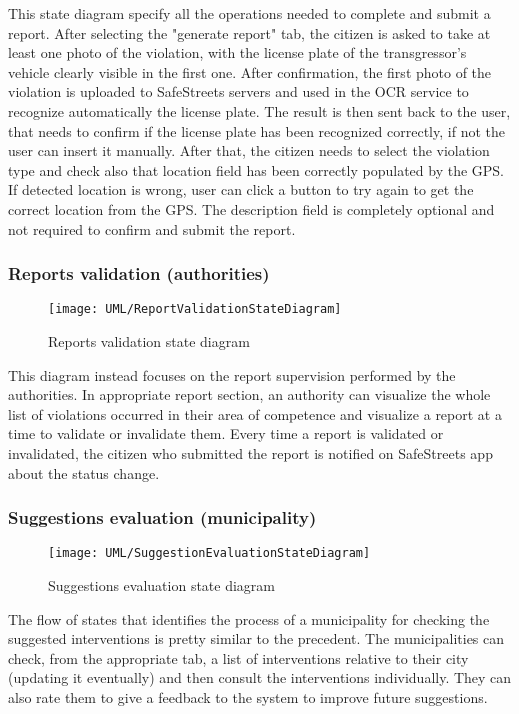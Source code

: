This state diagram specify all the operations needed to complete and submit a report. After selecting the "generate report" tab, the citizen is asked to take at least one photo of the violation, with the license plate of the transgressor's vehicle clearly visible in the first one. After confirmation, the first photo of the violation is uploaded to SafeStreets servers and used in the OCR service to recognize automatically the license plate. The result is then sent back to the user, that needs to confirm if the license plate has been recognized correctly, if not the user can insert it manually. After that, the citizen needs to select the violation type and check also that location field has been correctly populated by the GPS. If detected location is wrong, user can click a button to try again to get the correct location from the GPS. The description field is completely optional and not required to confirm and submit the report.

\subsubsection{Reports validation (authorities)}

\begin{figure}[H]
	\centering
	\texttt{[image: UML/ReportValidationStateDiagram]}
	\caption{Reports validation state diagram}
\end{figure}

This diagram instead focuses on the report supervision performed by the authorities. In appropriate report section, an authority can visualize the whole list of violations occurred in their area of competence and visualize a report at a time to validate or invalidate them. Every time a report is validated or invalidated, the citizen who submitted the report is notified on SafeStreets app about the status change.

\subsubsection{Suggestions evaluation (municipality)}

\begin{figure}[H]
	\centering
	\texttt{[image: UML/SuggestionEvaluationStateDiagram]}
	\caption{Suggestions evaluation state diagram}
\end{figure}

The flow of states that identifies the process of a municipality for checking the suggested interventions is pretty similar to the precedent. The municipalities can check, from the appropriate tab, a list of interventions relative to their city (updating it eventually) and then consult the interventions individually. They can also rate them to give a feedback to the system to improve future suggestions.

